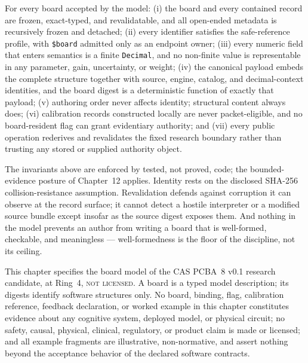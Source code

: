 \begin{invariant}\label{ch05:inv:summary}
For every board accepted by the model:
(i) the board and every contained record are frozen, exact-typed, and
revalidatable, and all open-ended metadata is recursively frozen and
detached;
(ii) every identifier satisfies the safe-reference profile, with
\texttt{\$board} admitted only as an endpoint owner;
(iii) every numeric field that enters semantics is a finite
\texttt{Decimal}, and no non-finite value is representable in any
parameter, gain, uncertainty, or weight;
(iv) the canonical payload embeds the complete structure together with
source, engine, catalog, and decimal-context identities, and the board
digest is a deterministic function of exactly that payload;
(v) authoring order never affects identity; structural content always
does;
(vi) calibration records constructed locally are never packet-eligible,
and no board-resident flag can grant evidentiary authority; and
(vii) every public operation rederives and revalidates the fixed
research boundary rather than trusting any stored or supplied authority
object.
\end{invariant}

\begin{threat}\label{ch05:threat:limits}
The invariants above are enforced by tested, not proved, code; the
bounded-evidence posture of Chapter~12 applies. Identity rests on the
disclosed SHA-256 collision-resistance assumption. Revalidation defends
against corruption it can observe at the record surface; it cannot
detect a hostile interpreter or a modified source bundle except insofar
as the source digest exposes them. And nothing in the model prevents an
author from writing a board that is well-formed, checkable, and
meaningless --- well-formedness is the floor of the discipline, not its
ceiling.
\end{threat}

\begin{boundary}\label{ch05:bnd:main}
This chapter specifies the board model of the CAS PCBA~8 v0.1 research
candidate, at Ring~4, \textsc{not licensed}. A board is a typed model
description; its digests identify software structures only. No board,
binding, flag, calibration reference, feedback declaration, or worked
example in this chapter constitutes evidence about any cognitive system,
deployed model, or physical circuit; no safety, causal, physical,
clinical, regulatory, or product claim is made or licensed; and all
example fragments are illustrative, non-normative, and assert nothing
beyond the acceptance behavior of the declared software contracts.
\end{boundary}

